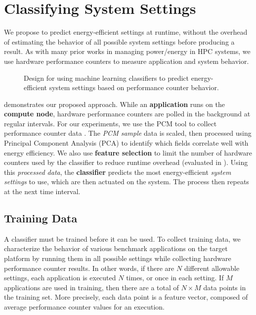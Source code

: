 \section{Classifying System Settings}
\label{sec:classifiers-framework}

We propose to predict energy-efficient settings at runtime, without the overhead of estimating the behavior of all possible system settings before producing a result.
As with many prior works in managing power/energy in HPC systems, we use hardware performance counters to measure application and system behavior.

\begin{figure}[t]
  \begin{centering}
    
    \caption{Design for using machine learning classifiers to predict energy-efficient system settings based on performance counter behavior.}
    \label{fig:classifier-runtime}
  \end{centering}
\end{figure}

 demonstrates our proposed approach.
While an \textbf{application} runs on the \textbf{compute node}, hardware performance counters are polled in the background at regular intervals.
For our experiments, we use the PCM tool to collect performance counter data \cite{PCMGit}.
The \emph{PCM sample} data is scaled, then processed using Principal Component Analysis (PCA) to identify which fields correlate well with energy efficiency.
We also use \textbf{feature selection} to limit the number of hardware counters used by the classifier to reduce runtime overhead (evaluated in ).
Using this \emph{processed data}, the \textbf{classifier} predicts the most energy-efficient \emph{system settings} to use, which are then actuated on the system.
The process then repeats at the next time interval.


\subsection{Training Data}


A classifier must be trained before it can be used.
To collect training data, we characterize the behavior of various benchmark applications on the target platform by running them in all possible settings while collecting hardware performance counter results.
In other words, if there are $N$ different allowable settings, each application is executed $N$ times, or once in each setting.
If $M$ applications are used in training, then there are a total of $N \times M$ data points in the training set.
More precisely, each data point is a feature vector, composed of average performance counter values for an execution.

